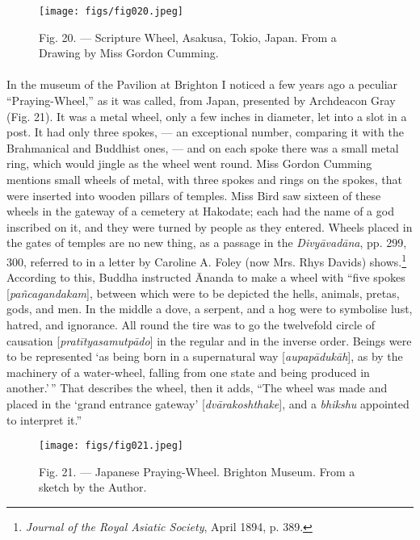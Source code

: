 \documentclass[a4paper, 11pt, oneside, polutonikogreek, english]{article}
\begin{document}
\begin{figure}[H]
\centering
\texttt{[image: figs/fig020.jpeg]}
\caption[Fig. 20. --- Scripture Wheel, Asakusa, Tokio, Japan.]{Fig. 20. --- Scripture Wheel, Asakusa, Tokio, Japan. From a Drawing by Miss Gordon Cumming.}
\end{figure}
\paragraph{}
In the museum of the Pavilion at Brighton I noticed a few years ago a peculiar ``Praying-Wheel,'' as it was called, from Japan, presented by Archdeacon Gray (Fig. 21). It was a metal wheel, only a few inches in diameter, let into a slot in a post. It had only three spokes, --- an exceptional number, comparing it with the Brahmanical and Buddhist ones, --- and on each spoke there was a small metal ring, which would jingle as the wheel went round. Miss Gordon Cumming mentions small wheels of metal, with three spokes and rings on the spokes, that were inserted into wooden pillars of temples. Miss Bird saw sixteen of these wheels in the gateway of a cemetery at Hakodate; each had the name of a god inscribed on it, and they were turned by people as they entered. Wheels placed in the gates of temples are no new thing, as a passage in the \emph{Divyāvadāna}, pp. 299, 300, referred to in a letter by Caroline A. Foley (now Mrs. Rhys Davids) shows.\footnote{\emph{Journal of the Royal Asiatic Society}, April 1894, p. 389.} According to this, Buddha instructed Ānanda to make a wheel with ``five spokes [\emph{pañcagandakam}], between which were to be depicted the hells, animals, pretas, gods, and men. In the middle a dove, a serpent, and a hog were to symbolise lust, hatred, and ignorance. All round the tire was to go the twelvefold circle of causation [\emph{pratītyasamutpādo}] in the regular and in the inverse order. Beings were to be represented `as being born in a supernatural way [\emph{aupapādukāh}], as by the machinery of a water-wheel, falling from one state and being produced in another.'\,'' That describes the wheel, then it adds, ``The wheel was made and placed in the `grand entrance gateway' [\emph{dvārakoshthake}], and a \emph{bhikshu} appointed to interpret it.''

\begin{figure}[H]
\centering
\texttt{[image: figs/fig021.jpeg]}
\caption[Fig. 21. --- Japanese Praying-Wheel.]{Fig. 21. --- Japanese Praying-Wheel. Brighton Museum. From a sketch by the Author.}
\end{figure}
\end{document}

